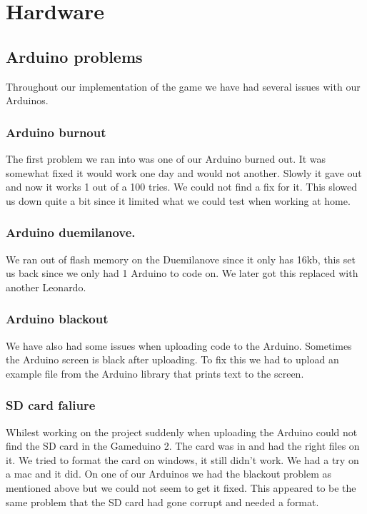 \section{Hardware}

\subsection{Arduino problems}
Throughout our implementation of the game we have had several issues with our Arduinos.

\subsubsection{Arduino burnout}
The first problem we ran into was one of our Arduino burned out. It was somewhat fixed it would work one day and would not another. Slowly it gave out and now it works 1 out of a 100 tries. We could not find a fix for it. This slowed us down quite a bit since it limited what we could test when working at home.

\subsubsection{Arduino duemilanove.}
We ran out of flash memory on the Duemilanove since it only has 16kb, this set us back since we only had 1 Arduino to code on. We later got this replaced with another Leonardo.

\subsubsection{Arduino blackout}
We have also had some issues when uploading code to the Arduino. Sometimes the Arduino screen is black after uploading. To fix this we had to upload an example file from the Arduino library that prints text to the screen.

\subsubsection{SD card faliure}
Whilest working on the project suddenly when uploading the Arduino could not find the SD card in the Gameduino 2. The card was in and had the right files on it. We tried to format the card on windows, it still didn't work. We had a try on a mac and it did. On one of our Arduinos we had the blackout problem as mentioned above but we could not seem to get it fixed. This appeared to be the same problem that the SD card had gone corrupt and needed a format.
